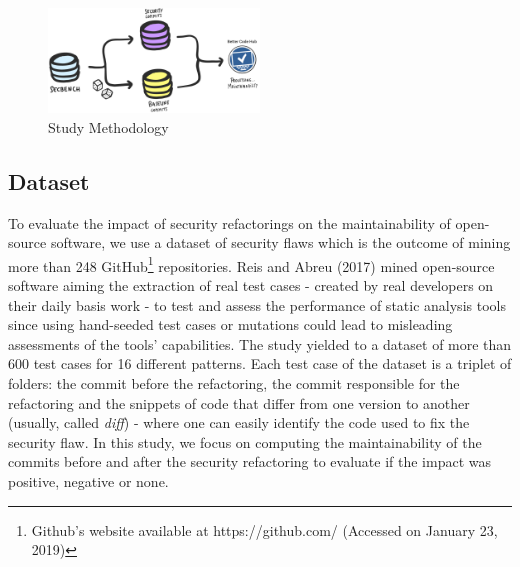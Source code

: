 \documentclass[10pt,conference]{IEEEtran}
\begin{document}
\begin{figure}[h]
 	\centering
 	\includegraphics[width=0.5\textwidth]{figures/methodology.pdf}
 	\caption{Study Methodology}
	\label{fig:met}
\end{figure}

\subsection{Dataset}

To evaluate the impact of security refactorings on the maintainability of open-source software, we use a dataset of security flaws which is the outcome of mining more than 248 GitHub\footnote{Github's website available at https://github.com/ (Accessed on January 23, 2019)} repositories. Reis and Abreu (2017) mined open-source software aiming the extraction of real test cases - created by real developers on their daily basis work - to test and assess the performance of static analysis tools since using hand-seeded test cases or mutations could lead to misleading assessments of the tools' capabilities. The study yielded to a dataset of more than 600 test cases for 16 different patterns. Each test case of the dataset is a triplet of folders: the commit before the refactoring, the commit responsible for the refactoring and the snippets of code that differ from one version to another (usually, called \textit{diff}) - where one can easily identify the code used to fix the security flaw. In this study, we focus on computing the maintainability of the commits before and after the security refactoring to evaluate if the impact was positive, negative or none. 
\end{document}
